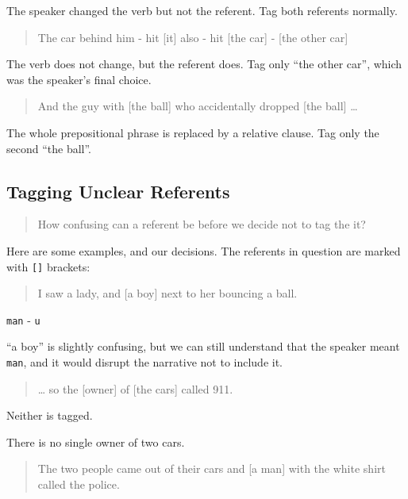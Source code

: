 \documentclass[
]{book}
\begin{document}
The speaker changed the verb but not the referent.
Tag both referents normally.

\begin{quote}
The car behind him - hit {[}it{]} also - hit {[}the car{]} - {[}the other car{]}
\end{quote}

The verb does not change, but the referent does.
Tag only ``the other car'', which was the speaker's final choice.

\begin{quote}
And the guy with {[}the ball{]} who accidentally dropped {[}the ball{]} \ldots{}
\end{quote}

The whole prepositional phrase is replaced by a relative clause.
Tag only the second ``the ball''.

\hypertarget{tagging-unclear-referents}{%
\subsection{Tagging Unclear Referents}\label{tagging-unclear-referents}}

\begin{quote}
How confusing can a referent be before we decide not to tag the it?
\end{quote}

Here are some examples, and our decisions.
The referents in question are marked with \texttt{{[}{]}} brackets:

\begin{quote}
I saw a lady, and {[}a boy{]} next to her bouncing a ball.
\end{quote}

\texttt{man} - \texttt{u}

``a boy'' is slightly confusing,
but we can still understand that the speaker meant \texttt{man},
and it would disrupt the narrative not to include it.

\begin{quote}
\ldots{} so the {[}owner{]} of {[}the cars{]} called 911.
\end{quote}

Neither is tagged.

There is no single owner of two cars.

\begin{quote}
The two people came out of their cars and {[}a man{]} with the white shirt called the police.
\end{quote}
\end{document}
